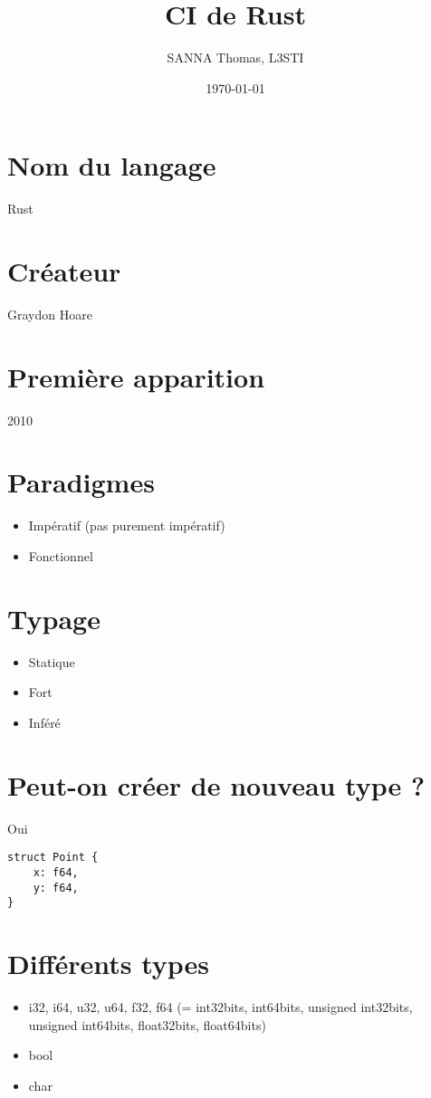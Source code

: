 \documentclass{article}
\title{CI de Rust}
\author{SANNA Thomas, L3STI}
\date{\today}
\begin{document}
\maketitle

\tableofcontents

\newpage

\section{Nom du langage}
Rust

\section{Créateur}
Graydon Hoare

\section{Première apparition}
2010

\section{Paradigmes}
\begin{itemize}
    \item Impératif (pas purement impératif)
    \item Fonctionnel
\end{itemize}

\section{Typage}
\begin{itemize}
    \item Statique
    \item Fort
    \item Inféré
\end{itemize}

\section{Peut-on créer de nouveau type ?}
Oui
\begin{lstlisting}[]
struct Point {
    x: f64,
    y: f64,
}
\end{lstlisting}

\section{Différents types}
\begin{itemize}
    \item i32, i64, u32, u64, f32, f64 (= int32bits, int64bits, unsigned int32bits, unsigned int64bits, float32bits, float64bits)
    \item bool
    \item char
\end{itemize}
\end{document}
